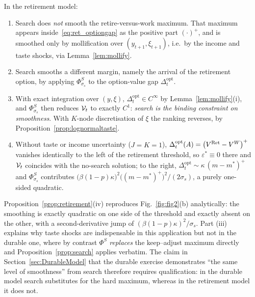\begin{proposition}
\label{prop:retirement}
In the retirement model:
\begin{enumerate}
    \item Search does \emph{not} smooth the retire-versus-work maximum. That maximum
    appears inside~\eqref{eq:ret_optiongap} as the positive part $(\cdot)^{+}$, and is
    smoothed only by mollification over $(y_{t+1},\xi_{t+1})$, i.e.\ by the income and
    taste shocks, via Lemma~\ref{lem:mollify}.
    \item Search smooths a different margin, namely the arrival of the retirement
    option, by applying $\Phi^{S}_{\sigma_s}$ to the option-value gap
    $\Delta_t^{\mathrm{opt}}$.
    \item With exact integration over $(y,\xi)$, $\Delta_t^{\mathrm{opt}}\in C^{\infty}$
    by Lemma~\ref{lem:mollify}(i), and $\Phi^{S}_{\sigma_s}$ then reduces
    $\mathcal{V}_t$ to exactly $C^{1}$: \emph{search is the binding constraint on
    smoothness}. With $K$-node discretisation of $\xi$ the ranking reverses, by
    Proposition~\ref{prop:lognormaltaste}.
    \item Without taste or income uncertainty ($J=K=1$),
    $\Delta_t^{\mathrm{opt}}(A)=\big(V^{\mathrm{Ret}}-V^{W}\big)^{+}$ vanishes identically to the
    left of the retirement threshold, so $\varepsilon^{\ast}\equiv0$ there and
    $\mathcal{V}_t$ coincides with the no-search solution; to the right,
    $\Delta_t^{\mathrm{opt}}\sim\kappa\,(m-m^{\ast})^{+}$ and
    $\Phi^{S}_{\sigma_s}$ contributes
    $\big(\beta(1-p)\kappa\big)^{2}\big((m-m^{\ast})^{+}\big)^{2}/(2\sigma_s)$, a purely
    one-sided quadratic.
\end{enumerate}
\end{proposition}

Proposition~\ref{prop:retirement}(iv) reproduces Fig.~\ref{fig:fig2}(b) analytically:
the smoothing is exactly quadratic on one side of the threshold and exactly absent on
the other, with a second-derivative jump of $(\beta(1-p)\kappa)^{2}/\sigma_s$. Part
(iii) explains why taste shocks are indispensable in this application but not in the
durable one, where by contrast $\Phi^{S}$ \emph{replaces} the keep--adjust maximum
directly and Proposition~\ref{prop:search} applies verbatim. The claim in
Section~\ref{sec:DurableModel} that the durable exercise demonstrates ``the same level
of smoothness'' from search therefore requires qualification: in the durable model
search substitutes for the hard maximum, whereas in the retirement model it does not.

